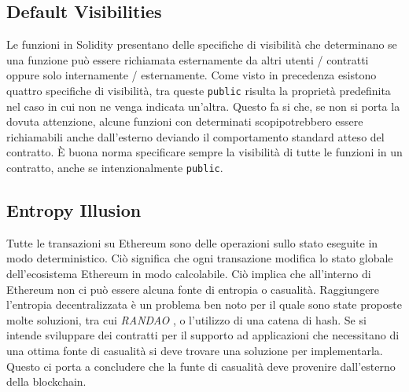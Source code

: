 \subsection*{Default Visibilities}
Le funzioni in Solidity presentano delle specifiche di visibilità che determinano se una funzione può essere richiamata esternamente da altri utenti / contratti oppure solo internamente / esternamente. Come visto in precedenza esistono quattro specifiche di visibilità, tra queste \lstinline|public| risulta la proprietà predefinita nel caso in cui non ne venga indicata un'altra. Questo fa si che, se non si porta la dovuta attenzione, alcune funzioni con determinati scopipotrebbero essere richiamabili anche dall'esterno deviando il comportamento standard atteso del contratto. È buona norma specificare sempre la visibilità di tutte le funzioni in un contratto, anche se intenzionalmente \lstinline|public|.

\subsection*{Entropy Illusion}
Tutte le transazioni su Ethereum sono delle operazioni sullo stato eseguite in modo deterministico. Ciò significa che ogni transazione modifica lo stato globale dell'ecosistema Ethereum in modo calcolabile. Ciò implica che all'interno di Ethereum non ci può essere alcuna fonte di entropia o casualità. Raggiungere l'entropia decentralizzata è un problema ben noto per il quale sono state proposte molte soluzioni, tra cui \textit{RANDAO} , o l'utilizzo di una catena di hash. Se si intende sviluppare dei contratti per il supporto ad applicazioni che necessitano di una ottima fonte di casualità si deve trovare una soluzione per implementarla. Questo ci porta a concludere che la funte di casualità deve provenire dall'esterno della blockchain.

